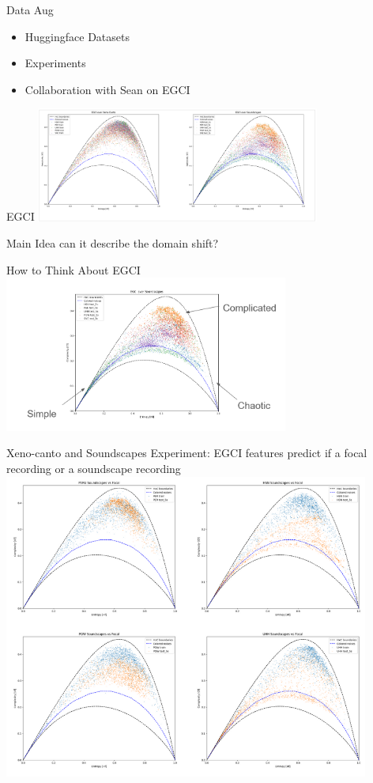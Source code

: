 
\begin{frame}{Data Aug}
    \begin{itemize}
        \item Huggingface Datasets
        \item Experiments
        \item Collaboration with Sean on EGCI
    \end{itemize}
\end{frame}

\begin{frame}{EGCI}
    \centering
    \includegraphics[height=0.7\textheight,width=0.7\textwidth,keepaspectratio]{images/EGCI_Example.png}
\end{frame}
\begin{frame}{Main Idea}
    can it describe the domain shift?
\end{frame}
\begin{frame}{How to Think About EGCI}
    \centering
    \includegraphics[height=0.7\textheight,width=0.7\textwidth,keepaspectratio]{images/intuition.png}
\end{frame}
\begin{frame}{Xeno-canto and Soundscapes}
    Experiment: EGCI features predict if a focal recording or a soundscape recording
    \centering
    \includegraphics[height=0.9\textheight,width=0.9\textwidth,keepaspectratio]{images/region_compare.png} 
\end{frame}

